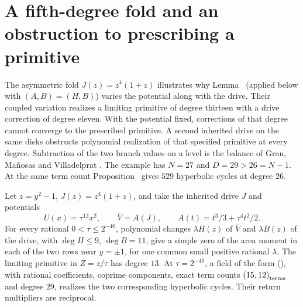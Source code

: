 \section{A fifth-degree fold and an obstruction to prescribing a primitive}\label{sec:quintic}

The asymmetric fold \(J(z)=z^4(1+z)\) illustrates why Lemma~ (applied below with \((A,B)=(H,B)\)) varies the potential along with the drive. Their coupled variation realizes a limiting primitive of degree thirteen with a drive correction of degree eleven. With the potential fixed, corrections of that degree cannot converge to the prescribed primitive. A second inherited drive on the same disks obstructs polynomial realization of that specified primitive at every degree. Subtraction of the two branch values on a level is the balance of Grau, Ma\~nosas and Villadelprat \cite[{\S}1, before Theorem~A]{GrauEtAl2011}. The example has $N=27$ and $D=29>26=N-1$. At the same term count Proposition~ gives $529$ hyperbolic cycles at degree $26$.

\begin{proposition}\label{prop:quintic}
Let $z=y^2-1$, $J(z)=z^4(1+z)$, and take the inherited drive $J$ and potentials
\[
 U(x)=\tau^{12}x^2,\qquad \bar V=A(J),\qquad
 A(t)=t^3/3+\tau^4 t^2/2 .
\]
For every rational $0<\tau\le2^{-40}$, polynomial changes $\lambda H(z)$ of $\bar V$ and $\lambda B(z)$ of the drive, with $\deg H\le9$, $\deg B=11$, give a simple zero of the area moment in each of the two rows near $y=\pm1$, for one common small positive rational $\lambda$. The limiting primitive in $Z=z/\tau$ has degree $13$. At $\tau=2^{-40}$, a field of the form (), with rational coefficients, coprime components, exact term counts $\left(15,12\right)_{\mathrm{terms}}$ and degree $29$, realizes the two corresponding hyperbolic cycles. Their return multipliers are reciprocal.
\end{proposition}

